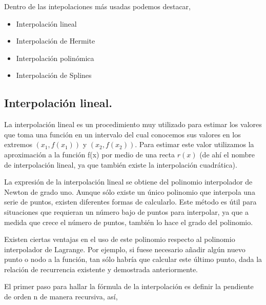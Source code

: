 \newpage

\hspace{0.4cm} Dentro de las intepolaciones m\'as usadas podemos destacar,

\begin{itemize}
  \item Interpolaci\'on lineal
  \item Interpolaci\'on de Hermite
  \item Interpolaci\'on polin\'omica 
  \item Interpolaci\'on de Splines 

\end{itemize}

\subsection{Interpolaci\'on lineal.\\}

\hspace{0.4cm} La interpolaci\'on lineal es un procedimiento muy utilizado para estimar los valores que toma una funci\'on en un intervalo del cual conocemos sus valores en los extremos $(x_{1}, f(x_{1}))$ y $(x_{2},f(x_{2}))$. Para estimar este valor utilizamos la aproximaci\'on a la funci\'on f(x) por medio de una recta $r(x)$ (de ah\'i el nombre de interpolaci\'on lineal, ya que tambi\'en existe la interpolaci\'on cuadr\'atica). 


\hspace{0.4cm} La expresi\'on de la interpolaci\'on lineal se obtiene del polinomio interpolador de Newton de grado uno. Aunque s\'olo existe un \'unico polinomio que interpola una serie de puntos, existen diferentes formas de calcularlo. Este m\'etodo es \'util para situaciones que requieran un n\'umero bajo de puntos para interpolar, ya que a medida que crece el n\'umero de puntos, tambi\'en lo hace el grado del polinomio.

\hspace{0.4cm} Existen ciertas ventajas en el uso de este polinomio respecto al polinomio interpolador de Lagrange. Por ejemplo, si fuese necesario a\~nadir alg\'un nuevo punto o nodo a la funci\'on, tan s\'olo habr\'ia que calcular este \'ultimo punto, dada la relaci\'on de recurrencia existente y demostrada anteriormente.

\hspace{0.4cm}El primer paso para hallar la f\'ormula de la interpolaci\'on es definir la pendiente de orden n de manera recursiva, as\'i,

